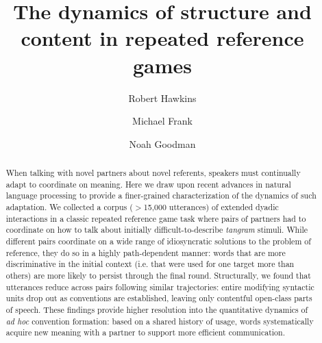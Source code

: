 \documentclass[alpha-refs]{wiley-article}
\title{The dynamics of structure and content in repeated reference games}
\author[1]{Robert Hawkins}
\author[1]{Michael Frank}
\author[1,2]{Noah Goodman}
\affil[1]{Department of Psychology, Stanford University}
\affil[2]{Department of Computer Science, Stanford University}
\begin{document}
\maketitle





\begin{abstract}
\small
When talking with novel partners about novel referents, speakers must continually adapt to coordinate on meaning. 
Here we draw upon recent advances in natural language processing to provide a finer-grained characterization of the dynamics of such adaptation.
We collected a corpus ($>$15,000 utterances) of extended dyadic interactions in a classic repeated reference game task where pairs of partners had to coordinate on how to talk about initially difficult-to-describe \emph{tangram} stimuli.
While different pairs coordinate on a wide range of idiosyncratic solutions to the problem of reference, they do so in a highly path-dependent manner: words that are more discriminative in the initial context (i.e. that were used for one target more than others) are more likely to persist through the final round.
Structurally, we found that utterances reduce across pairs following similar trajectories: entire modifying syntactic units drop out as conventions are established, leaving only contentful open-class parts of speech.
These findings provide higher resolution into the quantitative dynamics of \emph{ad hoc} convention formation: based on a shared history of usage, words systematically acquire new meaning with a partner to support more efficient communication.

\end{abstract}
\end{document}
